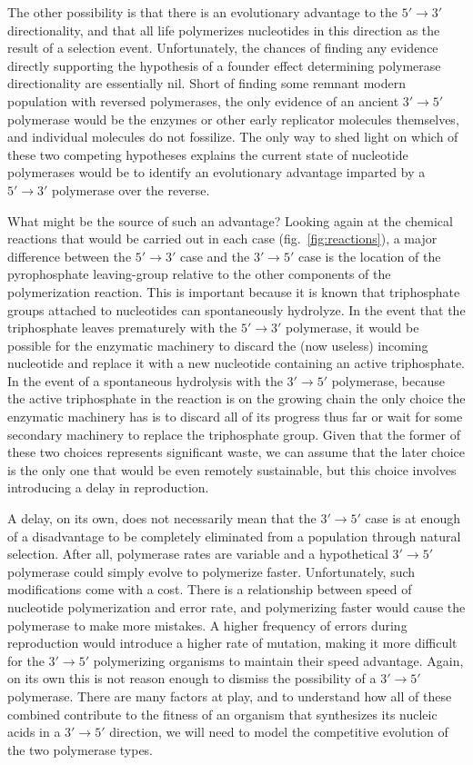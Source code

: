 The other possibility is that there is an evolutionary advantage to the $5'\to3'$ directionality, and that all life polymerizes nucleotides in this direction as the result of a selection event. Unfortunately, the chances of finding any evidence directly supporting the hypothesis of a founder effect determining polymerase directionality are essentially nil. Short of finding some remnant modern population with reversed polymerases, the only evidence of an ancient $3'\to5'$ polymerase would be the enzymes or other early replicator molecules themselves, and individual molecules do not fossilize. The only way to shed light on which of these two competing hypotheses explains the current state of nucleotide polymerases would be to identify an evolutionary advantage imparted by a $5'\to3'$ polymerase over the reverse.

What might be the source of such an advantage? Looking again at the chemical reactions that would be carried out in each case (fig.~\ref{fig:reactions}), a major difference between the $5'\to3'$ case and the $3'\to5'$ case is the location of the pyrophosphate leaving-group relative to the other components of the polymerization reaction. This is important because it is known that triphosphate groups attached to nucleotides can spontaneously hydrolyze\cite{Sigel:1983p720}. In the event that the triphosphate leaves prematurely with the $5'\to3'$ polymerase, it would be possible for the enzymatic machinery to discard the (now useless) incoming nucleotide and replace it with a new nucleotide containing an active triphosphate. In the event of a spontaneous hydrolysis with the $3'\to5'$ polymerase, because the active triphosphate in the reaction is on the growing chain the only choice the enzymatic machinery has is to discard all of its progress thus far or wait for some secondary machinery to replace the triphosphate group. Given that the former of these two choices represents significant waste, we can assume that the later choice is the only one that would be even remotely sustainable, but this choice involves introducing a delay in reproduction.

A delay, on its own, does not necessarily mean that the $3'\to5'$ case is at enough of a disadvantage to be completely eliminated from a population through natural selection. After all, polymerase rates are variable and a hypothetical $3'\to5'$ polymerase could simply evolve to polymerize faster. Unfortunately, such modifications come with a cost. There is a relationship between speed of nucleotide polymerization and error rate\cite{Griep:2006p719}, and polymerizing faster would cause the polymerase to make more mistakes. A higher frequency of errors during reproduction would introduce a higher rate of mutation, making it more difficult for the $3'\to5'$ polymerizing organisms to maintain their speed advantage. Again, on its own this is not reason enough to dismiss the possibility of a $3'\to5'$ polymerase. There are many factors at play, and to understand how all of these combined contribute to the fitness of an organism that synthesizes its nucleic acids in a $3'\to5'$ direction, we will need to model the competitive evolution of the two polymerase types.

